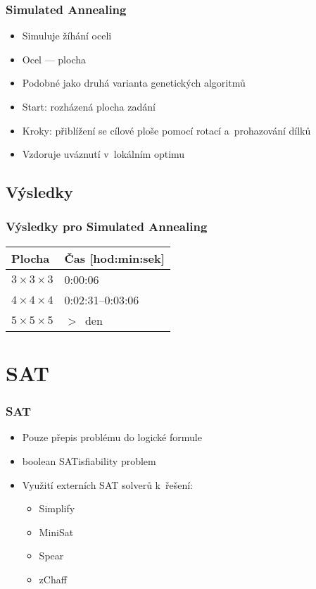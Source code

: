 \documentclass{beamer}
\begin{document}
\begin{frame}
\frametitle{Simulated Annealing}

\begin{itemize}
\item Simuluje žíhání oceli
\item Ocel --- plocha
\item Podobné jako druhá varianta genetických algoritmů
\item Start: rozházená plocha zadání
\item Kroky: přiblížení se cílové ploše pomocí rotací a~prohazování dílků
\item Vzdoruje uváznutí v~lokálním optimu 
\end{itemize}

\end{frame}


\subsection{Výsledky}

\begin{frame}
\frametitle{Výsledky pro Simulated Annealing}

\centering
\begin{tabular}{|l|l|}
\hline
\textbf{Plocha} & \textbf{Čas [hod:min:sek]} \\
\hline
$3 \times 3 \times 3$ & 0:00:06 \\
$4 \times 4 \times 4$ & 0:02:31--0:03:06 \\
$5 \times 5 \times 5$ & $>$~den \\
\hline
\end{tabular}

\end{frame}


\section{SAT}

\begin{frame}
\frametitle{SAT}

\begin{itemize}
\item Pouze přepis problému do logické formule
\item boolean SATisfiability problem
\item Využití externích SAT solverů k~řešení:
\begin{itemize}
\item Simplify
\item MiniSat
\item Spear
\item zChaff
\end{itemize}
\end{itemize}

\end{frame}
\end{document}
